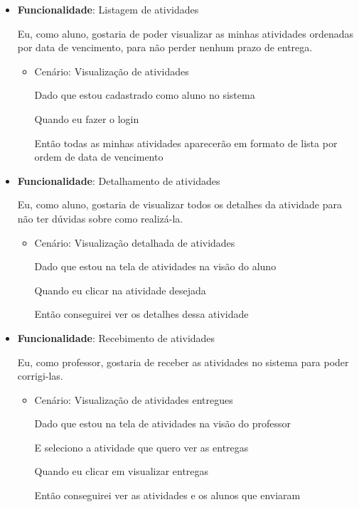 \documentclass[
    12pt,               %
    openright,          %
    oneside,
    a4paper,            %
    english,            %
    brazil              %
    ]{ifsp-spo-inf-ctds} %
\begin{document}
\begin{itemize}
\item\textbf{Funcionalidade}: Listagem de atividades
    
    Eu, como aluno, gostaria de poder visualizar as minhas atividades ordenadas por data de vencimento, para não perder nenhum prazo de entrega.
    \begin{itemize}
        \item Cenário: Visualização de atividades 
        \par Dado que estou cadastrado como aluno no sistema
        \par Quando eu fazer o login
        \par Então todas as minhas atividades aparecerão em formato de lista por ordem de data de vencimento
    \end{itemize}   

\item\textbf{Funcionalidade}: Detalhamento de atividades
    
    Eu, como aluno, gostaria de visualizar todos os detalhes da atividade para não ter dúvidas sobre como realizá-la.
    \begin{itemize}
        \item Cenário: Visualização detalhada de atividades  
        \par Dado que estou na tela de atividades na visão do aluno
        \par Quando eu clicar na atividade desejada
        \par Então conseguirei ver os detalhes dessa atividade
    \end{itemize}  

\item\textbf{Funcionalidade}: Recebimento de atividades
    
    Eu, como professor, gostaria de receber as atividades no sistema para poder corrigi-las.
    \begin{itemize}
        \item Cenário: Visualização de atividades entregues
        \par Dado que estou na tela de atividades na visão do professor
        \par E seleciono a atividade que quero ver as entregas
        \par Quando eu clicar em visualizar entregas
        \par Então conseguirei ver as atividades e os alunos que enviaram
    \end{itemize}


\end{itemize}
\end{document}
